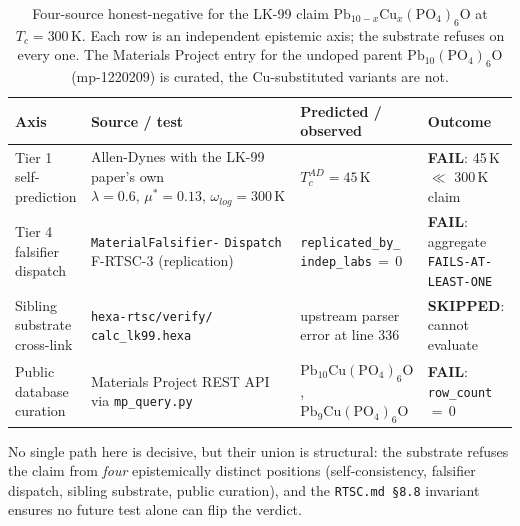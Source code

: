 \documentclass[11pt,a4paper]{article}
\begin{document}
\begin{table}[h]
\centering
\caption{Four-source honest-negative for the LK-99 claim
\(\mathrm{Pb}_{10-x}\mathrm{Cu}_{x}(\mathrm{PO}_{4})_{6}\mathrm{O}\)
at \(T_{c}{=}300\,\mathrm{K}\). Each row is an independent epistemic
axis; the substrate refuses on every one. The Materials Project entry
for the undoped parent \(\mathrm{Pb}_{10}(\mathrm{PO}_{4})_{6}\mathrm{O}\)
(mp-1220209) is curated, the Cu-substituted variants are not.}
\label{tab:lk99-neg}
\scriptsize
\renewcommand{\arraystretch}{1.25}
\begin{tabular}{@{}>{\raggedright\arraybackslash}p{2.5cm}
                  >{\raggedright\arraybackslash}p{4.6cm}
                  >{\raggedright\arraybackslash}p{3.4cm}
                  >{\raggedright\arraybackslash}p{3.8cm}@{}}
\toprule
\textbf{Axis} & \textbf{Source / test} & \textbf{Predicted / observed} & \textbf{Outcome} \\
\midrule
Tier 1 self-prediction
  & Allen-Dynes with the LK-99 paper's own \(\lambda{=}0.6,\,\mu^{*}{=}0.13,\,\omega_{log}{=}300\,\mathrm{K}\)
  & \(T_{c}^{AD}=45\,\mathrm{K}\)
  & \textcolor{honestred}{\textbf{FAIL}}: 45\,K \(\ll\) 300\,K claim \\
Tier 4 falsifier dispatch
  & \texttt{MaterialFalsifier-} \texttt{Dispatch} F-RTSC-3 (replication)
  & \texttt{replicated\_by\_} \texttt{indep\_labs}\,\(=\,0\)
  & \textcolor{honestred}{\textbf{FAIL}}: aggregate \texttt{FAILS-AT-} \texttt{LEAST-ONE} \\
Sibling substrate cross-link
  & \texttt{hexa-rtsc/verify/} \texttt{calc\_lk99.hexa}
  & upstream parser error at line 336
  & \textcolor{honestred}{\textbf{SKIPPED}}: cannot evaluate \\
Public database curation
  & Materials Project REST API via \texttt{mp\_query.py}
  & \(\mathrm{Pb}_{10}\mathrm{Cu}(\mathrm{PO}_{4})_{6}\mathrm{O}\), \(\mathrm{Pb}_{9}\mathrm{Cu}(\mathrm{PO}_{4})_{6}\mathrm{O}\)
  & \textcolor{honestred}{\textbf{FAIL}}: \texttt{row\_count}\,\(=\,0\) \\
\bottomrule
\end{tabular}
\end{table}

No single path here is decisive, but their union is structural: the
substrate refuses the claim from \emph{four} epistemically distinct
positions (self-consistency, falsifier dispatch, sibling substrate,
public curation), and the \texttt{RTSC.md \S 8.8} invariant ensures
no future test alone can flip the verdict.
\end{document}
